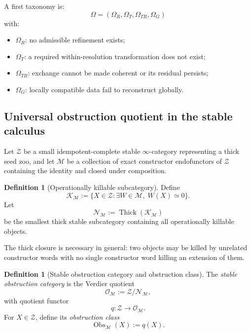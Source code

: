 \documentclass[11pt]{article}
\theoremstyle{definition}
\newtheorem{definition}[theorem]{Definition}
\theoremstyle{remark}
\newcommand{\Obs}{\operatorname{Obs}}
\begin{document}
A first taxonomy is:
\[
\boxed{
\Omega=(\Omega_R,\Omega_T,\Omega_{TR},\Omega_G)
}
\]
with:
\begin{itemize}
    \item $\Omega_R$: no admissible refinement exists;
    \item $\Omega_T$: a required within-resolution transformation does not exist;
    \item $\Omega_{TR}$: exchange cannot be made coherent or its residual persists;
    \item $\Omega_G$: locally compatible data fail to reconstruct globally.
\end{itemize}

\subsection{Universal obstruction quotient in the stable calculus}

Let $\mathcal Z$ be a small idempotent-complete stable $\infty$-category representing a thick seed zoo, and let $\mathscr M$ be a collection of exact constructor endofunctors of $\mathcal Z$ containing the identity and closed under composition.

\begin{definition}[Operationally killable subcategory]
Define
\[
\mathcal K_{\mathscr M}
:=
\{X\in\mathcal Z:\exists W\in\mathscr M,\;W(X)\simeq0\}.
\]
Let
\[
\mathcal N_{\mathscr M}
:=
\operatorname{Thick}(\mathcal K_{\mathscr M})
\]
be the smallest thick stable subcategory containing all operationally killable objects.
\end{definition}

The thick closure is necessary in general: two objects may be killed by unrelated constructor words with no single constructor word killing an extension of them.

\begin{definition}[Stable obstruction category and obstruction class]\label{def:obstruction-quotient}
The \emph{stable obstruction category} is the Verdier quotient
\[
\mathcal O_{\mathscr M}
:=
\mathcal Z/\mathcal N_{\mathscr M},
\]
with quotient functor
\[
q:\mathcal Z\longrightarrow\mathcal O_{\mathscr M}.
\]
For $X\in\mathcal Z$, define its \emph{obstruction class}
\[
\Obs_{\mathscr M}(X):=q(X).
\]
\end{definition}
\end{document}
